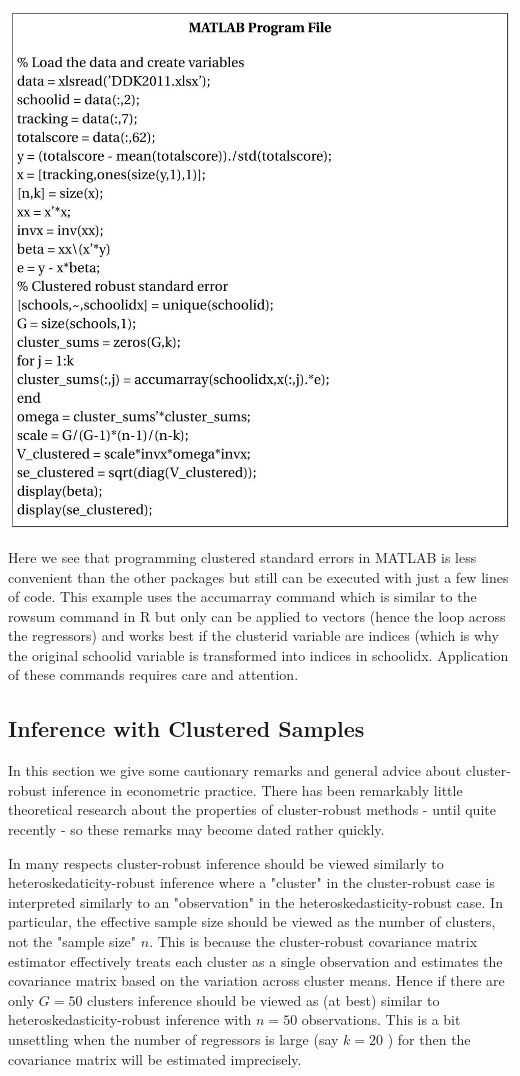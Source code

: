 \documentclass[10pt]{article}
\begin{document}
\includegraphics[max width=\textwidth]{2022_09_17_46fafb30295495354ae2g-33}

Here we see that programming clustered standard errors in MATLAB is less convenient than the other packages but still can be executed with just a few lines of code. This example uses the accumarray command which is similar to the rowsum command in $\mathrm{R}$ but only can be applied to vectors (hence the loop across the regressors) and works best if the clusterid variable are indices (which is why the original schoolid variable is transformed into indices in schoolidx. Application of these commands requires care and attention.

\subsection{Inference with Clustered Samples}
In this section we give some cautionary remarks and general advice about cluster-robust inference in econometric practice. There has been remarkably little theoretical research about the properties of cluster-robust methods - until quite recently - so these remarks may become dated rather quickly.

In many respects cluster-robust inference should be viewed similarly to heteroskedaticity-robust inference where a "cluster" in the cluster-robust case is interpreted similarly to an "observation" in the heteroskedasticity-robust case. In particular, the effective sample size should be viewed as the number of clusters, not the "sample size" $n$. This is because the cluster-robust covariance matrix estimator effectively treats each cluster as a single observation and estimates the covariance matrix based on the variation across cluster means. Hence if there are only $G=50$ clusters inference should be viewed as (at best) similar to heteroskedasticity-robust inference with $n=50$ observations. This is a bit unsettling when the number of regressors is large (say $k=20$ ) for then the covariance matrix will be estimated imprecisely.
\end{document}
